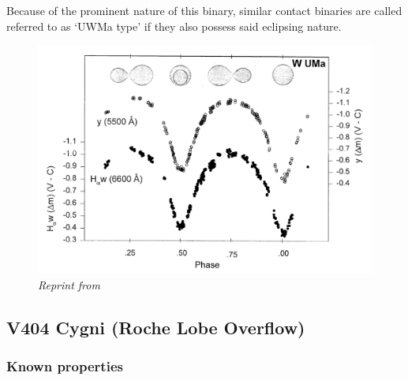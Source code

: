 \documentclass[12pt, a4paper]{article}
\begin{document}
        Because of the prominent nature of this binary, similar contact binaries are called referred to as `UWMa type' if they also possess said eclipsing nature. 

        \begin{figure}[H]
            \centering
            \includegraphics[scale= .3]{figs/W Uma Lightcurve.png}
            \caption{\textit{Reprint from~\parencite{Morgan_1997}}}
            \label{WUMaLightcruve}
        \end{figure}


    \subsection{\centering V404 Cygni (Roche Lobe Overflow)}
        \subsubsection{Known properties}
\end{document}
